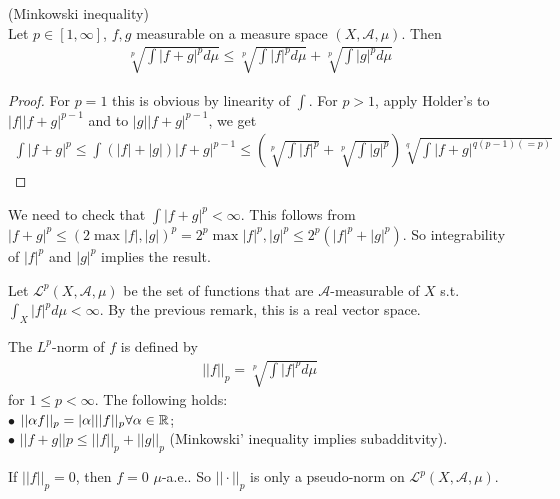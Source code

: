 \documentclass[a4paper]{article}
\begin{document}
\begin{prop} (Minkowski inequality)\\
Let $p \in [1,\infty]$, $f,g $ measurable on a measure space $(X,\mathcal{A},\mu)$. Then
\begin{equation*}
\begin{aligned}
\sqrt[p]{\int|f+g|^p d\mu} \leq \sqrt[p]{\int|f|^p d\mu} + \sqrt[p]{\int|g|^p d\mu}
\end{aligned}
\end{equation*}
\begin{proof}
For $p=1$ this is obvious by linearity of $\int$. For $p>1$, apply Holder's to $|f| |f+g|^{p-1}$ and to $|g| |f+g|^{p-1}$, we get 
\begin{equation*}
\begin{aligned}
\int |f+g|^p \leq \int(|f|+|g|) |f+g|^{p-1}\leq \left(\sqrt[p]{\int |f|^p}+\sqrt[p]{\int|g|^p}\right)\sqrt[q]{\int|f+g|^{q(p-1) (=p)}}
\end{aligned}
\end{equation*}
\end{proof}
\end{prop}

We need to check that $\int|f+g|^p < \infty$. This follows from $|f+g|^p \leq (2\max |f|,|g|)^p = 2^p \max |f|^p,|g|^p \leq 2^p(|f|^p + |g|^p)$. So integrability of $|f|^p$ and $|g|^p$ implies the result.

\begin{notation}
Let $\mathcal{L}^p(X,\mathcal{A},\mu)$ be the set of functions that are $\mathcal{A}$-measurable of $X$ s.t. $\int_X |f|^p d\mu < \infty$. By the previous remark, this is a real vector space.
\end{notation}

\begin{defi}
The $L^p$-norm of $f$ is defined by
\begin{equation*}
\begin{aligned}
||f||_p = \sqrt[p]{\int|f|^p d\mu}
\end{aligned}
\end{equation*}
for $1 \leq p < \infty$. The following holds:\\
$\bullet$ $||\alpha f||_p = |\alpha| ||f||_p \forall \alpha \in \mathbb{R}$;\\
$\bullet$ $||f+g||p \leq ||f||_p + ||g||_p$ (Minkowski' inequality implies subadditvity).
\end{defi}

\begin{rem}
If $||f||_p =0 $, then $f=0$ $\mu$-a.e.. So $||\cdot||_p$ is only a pseudo-norm on $\mathcal{L}^p(X,\mathcal{A},\mu)$.
\end{rem}
\end{document}

